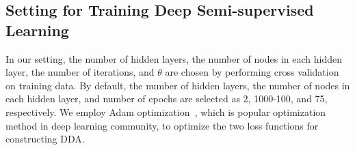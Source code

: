 




\subsection{Setting for Training Deep Semi-supervised Learning}
\label{sec:setting}
In our setting, the number of hidden layers, the number of nodes in each hidden layer, the number of iterations, and $\theta$ are chosen by performing cross validation on training data. By default, the number of hidden layers, the number of nodes in each hidden layer, and number of epochs are selected as 2, 1000-100, and 75, respectively. We employ Adam optimization~\cite{kingma2014adam}, which is popular optimization method in deep learning community, to optimize the two loss functions for constructing DDA. %


